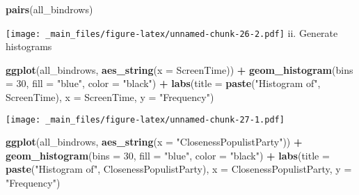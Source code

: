 \documentclass[
]{book}
\newenvironment{Shaded}{\begin{snugshade}}{\end{snugshade}}
\newcommand{\AttributeTok}[1]{\textcolor[rgb]{0.13,0.29,0.53}{#1}}
\newcommand{\DecValTok}[1]{\textcolor[rgb]{0.00,0.00,0.81}{#1}}
\newcommand{\FunctionTok}[1]{\textcolor[rgb]{0.13,0.29,0.53}{\textbf{#1}}}
\newcommand{\NormalTok}[1]{#1}
\newcommand{\SpecialCharTok}[1]{\textcolor[rgb]{0.81,0.36,0.00}{\textbf{#1}}}
\newcommand{\StringTok}[1]{\textcolor[rgb]{0.31,0.60,0.02}{#1}}
\begin{document}
\begin{Shaded}
\begin{Highlighting}[]
\FunctionTok{pairs}\NormalTok{(all\_bindrows)}
\end{Highlighting}
\end{Shaded}

\texttt{[image: \_main\_files/figure-latex/unnamed-chunk-26-2.pdf]}
ii. Generate histograms

\begin{Shaded}
\begin{Highlighting}[]
\FunctionTok{ggplot}\NormalTok{(all\_bindrows, }\FunctionTok{aes\_string}\NormalTok{(}\AttributeTok{x =} \StringTok{\textquotesingle{}ScreenTime\textquotesingle{}}\NormalTok{)) }\SpecialCharTok{+} 
      \FunctionTok{geom\_histogram}\NormalTok{(}\AttributeTok{bins =} \DecValTok{30}\NormalTok{, }\AttributeTok{fill =} \StringTok{"blue"}\NormalTok{, }\AttributeTok{color =} \StringTok{"black"}\NormalTok{) }\SpecialCharTok{+}
      \FunctionTok{labs}\NormalTok{(}\AttributeTok{title =} \FunctionTok{paste}\NormalTok{(}\StringTok{"Histogram of"}\NormalTok{, }\StringTok{\textquotesingle{}ScreenTime\textquotesingle{}}\NormalTok{), }\AttributeTok{x =} \StringTok{\textquotesingle{}ScreenTime\textquotesingle{}}\NormalTok{, }\AttributeTok{y =} \StringTok{"Frequency"}\NormalTok{)}
\end{Highlighting}
\end{Shaded}

\texttt{[image: \_main\_files/figure-latex/unnamed-chunk-27-1.pdf]}

\begin{Shaded}
\begin{Highlighting}[]
\FunctionTok{ggplot}\NormalTok{(all\_bindrows, }\FunctionTok{aes\_string}\NormalTok{(}\AttributeTok{x =} \StringTok{"ClosenessPopulistParty"}\NormalTok{)) }\SpecialCharTok{+} 
      \FunctionTok{geom\_histogram}\NormalTok{(}\AttributeTok{bins =} \DecValTok{30}\NormalTok{, }\AttributeTok{fill =} \StringTok{"blue"}\NormalTok{, }\AttributeTok{color =} \StringTok{"black"}\NormalTok{) }\SpecialCharTok{+}
      \FunctionTok{labs}\NormalTok{(}\AttributeTok{title =} \FunctionTok{paste}\NormalTok{(}\StringTok{"Histogram of"}\NormalTok{, }\StringTok{\textquotesingle{}ClosenessPopulistParty\textquotesingle{}}\NormalTok{), }\AttributeTok{x =} \StringTok{\textquotesingle{}ClosenessPopulistParty\textquotesingle{}}\NormalTok{, }\AttributeTok{y =} \StringTok{"Frequency"}\NormalTok{)}
\end{Highlighting}
\end{Shaded}
\end{document}
